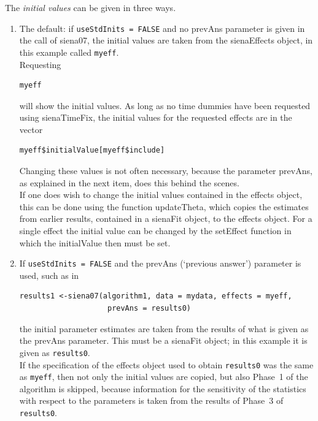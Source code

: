 \documentclass[a4paper,fleqn,11pt]{article}
\newcommand{\+}{\, + \,}
\newcommand{\sfn}[1]{\textsf{#1}}
\begin{document}
The \emph{initial values} can be given in three ways.
\begin{enumerate}
\item The default: if \texttt{useStdInits = FALSE} and no \textsf{prevAns}
      parameter is given in the call of \textsf{siena07},
      the initial values are taken from the \textsf{sienaEffects} object,
      in this example called \texttt{myeff}.\\
      Requesting
\begin{verbatim}
myeff
\end{verbatim}
      will show the initial values.
      As long as no time dummies have been requested
      using \textsf{sienaTimeFix}, the initial values for the requested
      effects are in the vector
\begin{verbatim}
myeff$initialValue[myeff$include]
\end{verbatim}
      Changing these values is not often necessary, because the
      parameter \textsf{prevAns}, as explained in the next item,
      does this behind the scenes.\\
       If one does wish to change the initial values contained in
      the effects object, this can be done using the
      function \textsf{updateTheta}, which copies the
      estimates from earlier results, contained in a
      \sfn{sienaFit} object, to the effects object.
      For a single effect the initial value can be changed
      by the \textsf{setEffect}
      function in which the \textsf{initialValue} then must be set.
\item If \texttt{useStdInits = FALSE} and the \textsf{prevAns}
      (`previous answer')
      parameter is used, such as in
      \begin{verbatim}
results1 <-siena07(algorithm1, data = mydata, effects = myeff,
                    prevAns = results0)
      \end{verbatim}
      the initial parameter estimates are taken from the results of
      what is given as the
      \textsf{prevAns} parameter. This must be a
      \textsf{sienaFit} object; in this example it is given as
      \texttt{results0}.\\
      If the specification of the effects object used to obtain
      \texttt{results0} was the same as \texttt{myeff}, then not only the initial
      values are copied, but also Phase~1 of the algorithm is skipped,
      because information for the sensitivity of the statistics with
      respect to the parameters is taken from the results of Phase~3
      of \texttt{results0}.\\

\end{enumerate}
\end{document}
